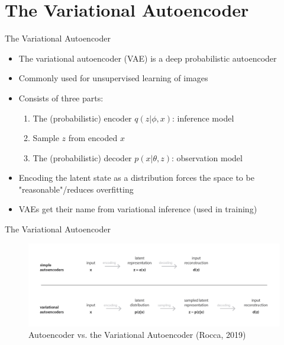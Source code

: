 \documentclass[10pt]{beamer}
\begin{document}
\section{The Variational Autoencoder}

\begin{frame}{The Variational Autoencoder}
\begin{itemize}
\item The variational autoencoder (VAE) is a {\color{uured} deep probabilistic autoencoder}
\item Commonly used for unsupervised learning of {\color{uured} images}\pause
\item Consists of {\color{uured} three parts}:
\begin{enumerate}
\item The (probabilistic) encoder $q(z|\phi, x)$: inference model
\item Sample $z$ from encoded $x$
\item The (probabilistic) decoder $p(x|\theta, z)$: observation model
\end{enumerate}
\pause
\item Encoding the {\color{uured} latent state as a distribution} forces the space to be "reasonable"/reduces overfitting
\pause
\item VAEs get their name from {\color{uured} variational inference} (used in training)
\end{itemize}

\end{frame}


\begin{frame}{The Variational Autoencoder}

\begin{figure}[h]
\centering
\includegraphics[width=1\textwidth]{fig/Rocca_AE_vs_VAE.png}
\caption{Autoencoder vs. the Variational Autoencoder (Rocca, 2019)}
\end{figure}

\end{frame}
\end{document}
